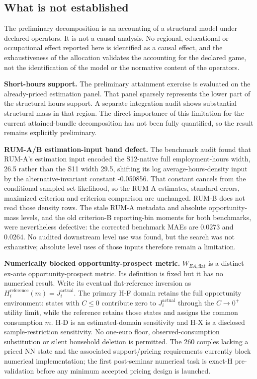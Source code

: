 \documentclass[11pt,a4paper]{article}
\begin{document}
\subsection{What is not established}\label{what-is-not-established}

The preliminary decomposition is an accounting of a structural model under declared operators. It is not a causal analysis. No regional, educational or occupational effect reported here is identified as a causal effect, and the exhaustiveness of the allocation validates the accounting for the declared game, not the identification of the model or the normative content of the operators.

\textbf{Short-hours support.} The preliminary attainment exercise is evaluated on the already-priced estimation panel. That panel sparsely represents the lower part of the structural hours support. A separate integration audit shows substantial structural mass in that region. The direct importance of this limitation for the current attained-bundle decomposition has not been fully quantified, so the result remains explicitly preliminary.

\textbf{RUM-A/B estimation-input band defect.} The benchmark audit found that RUM-A's estimation input encoded the S12-native full employment-hours width, 26.5 rather than the S11 width 29.5, shifting its log average-hours-density input by the alternative-invariant constant -0.050856. That constant cancels from the conditional sampled-set likelihood, so the RUM-A estimates, standard errors, maximized criterion and criterion comparison are unchanged. RUM-B does not read those density rows. The stale RUM-A metadata and absolute opportunity-mass levels, and the old criterion-B reporting-bin moments for both benchmarks, were nevertheless defective: the corrected benchmark MAEs are 0.0273 and 0.0264. No audited downstream level use was found, but the search was not exhaustive; absolute level uses of those inputs therefore remain a limitation.

\textbf{Numerically blocked opportunity-prospect metric.} \(W_{EA,\mathrm{flat}}\) is a distinct ex-ante opportunity-prospect metric. Its definition is fixed but it has no numerical result. Write its eventual flat-reference inversion as \(H_i^{\mathrm{reference}}(m)=J_i^{\mathrm{actual}}\). The primary H-F domain retains the full opportunity environment: states with \(C\leq0\) contribute zero to \(J_i^{\mathrm{actual}}\) through the \(C\rightarrow0^+\) utility limit, while the reference retains those states and assigns the common consumption \(m\). H-D is an estimated-domain sensitivity and H-X is a disclosed sample-restriction sensitivity. No one-euro floor, observed-consumption substitution or silent household deletion is permitted. The 260 couples lacking a priced NN state and the associated support/pricing requirements currently block numerical implementation; the first post-seminar numerical task is exact-H pre-validation before any minimum accepted pricing design is launched.
\end{document}
